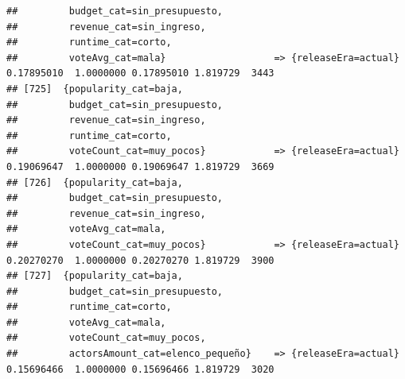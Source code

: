 \documentclass[
]{article}
\begin{document}
\begin{verbatim}
##         budget_cat=sin_presupuesto,                                                                                             
##         revenue_cat=sin_ingreso,                                                                                                
##         runtime_cat=corto,                                                                                                      
##         voteAvg_cat=mala}                   => {releaseEra=actual}               0.17895010  1.0000000 0.17895010 1.819729  3443
## [725]  {popularity_cat=baja,                                                                                                    
##         budget_cat=sin_presupuesto,                                                                                             
##         revenue_cat=sin_ingreso,                                                                                                
##         runtime_cat=corto,                                                                                                      
##         voteCount_cat=muy_pocos}            => {releaseEra=actual}               0.19069647  1.0000000 0.19069647 1.819729  3669
## [726]  {popularity_cat=baja,                                                                                                    
##         budget_cat=sin_presupuesto,                                                                                             
##         revenue_cat=sin_ingreso,                                                                                                
##         voteAvg_cat=mala,                                                                                                       
##         voteCount_cat=muy_pocos}            => {releaseEra=actual}               0.20270270  1.0000000 0.20270270 1.819729  3900
## [727]  {popularity_cat=baja,                                                                                                    
##         budget_cat=sin_presupuesto,                                                                                             
##         runtime_cat=corto,                                                                                                      
##         voteAvg_cat=mala,                                                                                                       
##         voteCount_cat=muy_pocos,                                                                                                
##         actorsAmount_cat=elenco_pequeño}    => {releaseEra=actual}               0.15696466  1.0000000 0.15696466 1.819729  3020

\end{verbatim}
\end{document}
